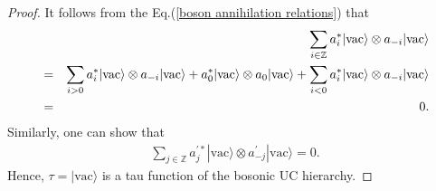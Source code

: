 \documentclass[11pt,reqno]{amsart}
\numberwithin{equation}{section}
\begin{document}
\begin{proof}
It follows from the Eq.(\ref{boson annihilation relations}) that
\begin{eqnarray}
&&\sum\limits_{i\in\mathbb{Z}}a^{\ast}_{i}|\text{vac}\rangle\otimes a_{-i}|\text{vac}\rangle\notag\\
&=&\sum\limits_{i>0}a^{\ast}_{i}|\text{vac}\rangle\otimes a_{-i}|\text{vac}\rangle+a^{\ast}_{0}|\text{vac}\rangle\otimes a_{0}|\text{vac}\rangle+\sum\limits_{i<0}a^{\ast}_{i}|\text{vac}\rangle\otimes a_{-i}|\text{vac}\rangle\notag\\
&=&0.
\end{eqnarray}
Similarly, one can show that
\begin{eqnarray}
\sum\limits_{j\in\mathbb{Z}}a^{\prime\ast}_{j}|\text{vac}\rangle\otimes a^{\prime}_{-j}|\text{vac}\rangle=0.
\end{eqnarray}
Hence, $\tau=|\text{vac}\rangle$ is a tau function of the bosonic UC hierarchy.


\end{proof}
\end{document}
